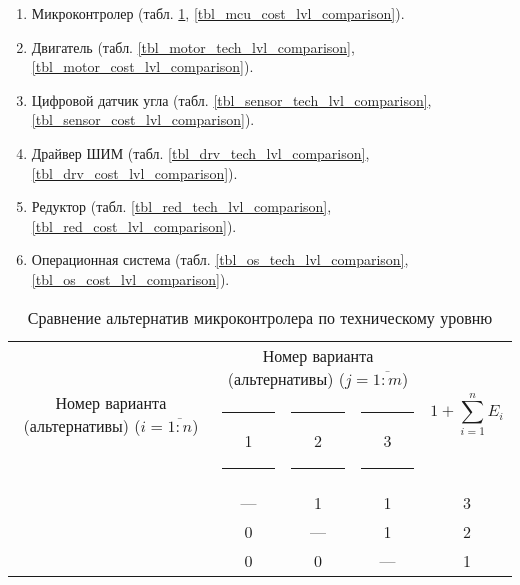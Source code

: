 \begin{enumerate}
    \item Микроконтролер (табл.
        \ref{tbl_mcu_tech_lvl_comparison},
        \ref{tbl_mcu_cost_lvl_comparison}).

    \item Двигатель (табл.
        \ref{tbl_motor_tech_lvl_comparison},
        \ref{tbl_motor_cost_lvl_comparison}).

    \item Цифровой датчик угла (табл.
        \ref{tbl_sensor_tech_lvl_comparison},
        \ref{tbl_sensor_cost_lvl_comparison}).

    \item Драйвер ШИМ (табл.
        \ref{tbl_drv_tech_lvl_comparison},
        \ref{tbl_drv_cost_lvl_comparison}).

    \item Редуктор (табл.
        \ref{tbl_red_tech_lvl_comparison},
        \ref{tbl_red_cost_lvl_comparison}).

    \item Операционная система (табл.
        \ref{tbl_os_tech_lvl_comparison},
        \ref{tbl_os_cost_lvl_comparison}).

\end{enumerate}

\begin{table}[ht!]
    \centering
    \begin{tabular}{|c|c|c|c|c|}
        \hline
        \multirow{2}{2.4cm}[-0.5pc]{
            \centering
            Номер варианта (альтернативы) ($i = \overline{1:n}$)
        } &
        \multicolumn{3}{c|}{
            \parbox[t]{2.4cm}{
                \centering
                Номер варианта (альтернативы) ($j = \overline{1:m}$)
            }
        } &
        \multirow{2}{1.7cm}{
            \centering
            $$1 + \sum_{i=1}^n E_i$$
        } \\
        &
        \centering \rule{2pt}{0pt} 1 \rule{2pt}{0pt} &
        \centering \rule{2pt}{0pt} 2 \rule{2pt}{0pt} &
        \centering \rule{2pt}{0pt} 3 \rule{2pt}{0pt} & \\
        \hline \hline
        \centering{1} &---& 1 & 1 & 3 \\ \hline
        \centering{2} & 0 &---& 1 & 2 \\ \hline
        \centering{3} & 0 & 0 &---& 1 \\ \hline
    \end{tabular}
    \caption{Сравнение альтернатив микроконтролера по техническому уровню}
    \label{tbl_mcu_tech_lvl_comparison}
\end{table}

